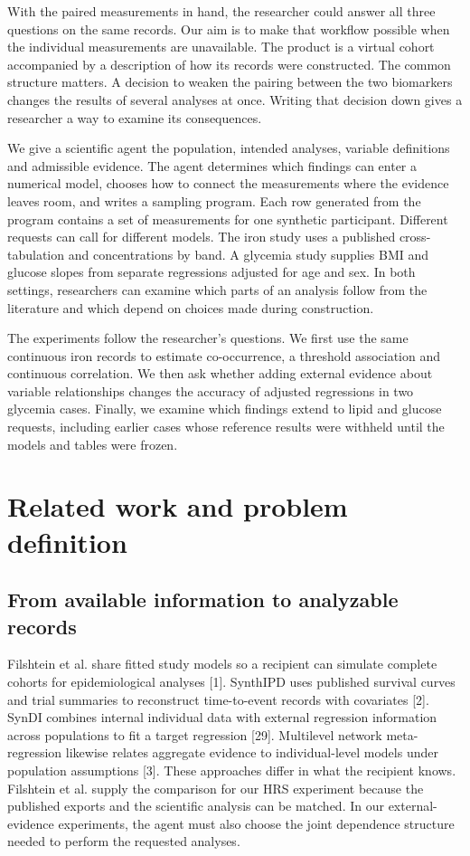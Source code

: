 \documentclass[11pt,letterpaper]{article}
\begin{document}
With the paired measurements in hand, the researcher could answer all three questions on the same records. Our aim is to make that workflow possible when the individual measurements are unavailable. The product is a virtual cohort accompanied by a description of how its records were constructed. The common structure matters. A decision to weaken the pairing between the two biomarkers changes the results of several analyses at once. Writing that decision down gives a researcher a way to examine its consequences.


We give a scientific agent the population, intended analyses, variable definitions and admissible evidence. The agent determines which findings can enter a numerical model, chooses how to connect the measurements where the evidence leaves room, and writes a sampling program. Each row generated from the program contains a set of measurements for one synthetic participant. Different requests can call for different models. The iron study uses a published cross-tabulation and concentrations by band. A glycemia study supplies BMI and glucose slopes from separate regressions adjusted for age and sex. In both settings, researchers can examine which parts of an analysis follow from the literature and which depend on choices made during construction.


The experiments follow the researcher's questions. We first use the same continuous iron records to estimate co-occurrence, a threshold association and continuous correlation. We then ask whether adding external evidence about variable relationships changes the accuracy of adjusted regressions in two glycemia cases. Finally, we examine which findings extend to lipid and glucose requests, including earlier cases whose reference results were withheld until the models and tables were frozen.


\section{Related work and problem definition}

\subsection{From available information to analyzable records}

Filshtein et al. share fitted study models so a recipient can simulate complete cohorts for epidemiological analyses [1]. SynthIPD uses published survival curves and trial summaries to reconstruct time-to-event records with covariates [2]. SynDI combines internal individual data with external regression information across populations to fit a target regression [29]. Multilevel network meta-regression likewise relates aggregate evidence to individual-level models under population assumptions [3]. These approaches differ in what the recipient knows. Filshtein et al. supply the comparison for our HRS experiment because the published exports and the scientific analysis can be matched. In our external-evidence experiments, the agent must also choose the joint dependence structure needed to perform the requested analyses.
\end{document}
